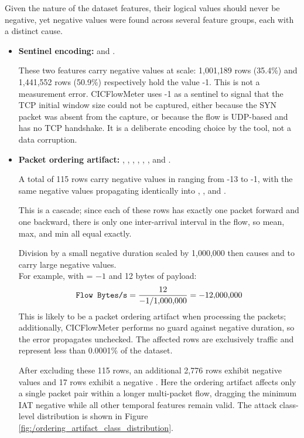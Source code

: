 Given the nature of the dataset features, their logical values should never be negative, yet negative values were found across several feature groups, each with a distinct cause.
\begin{itemize}
    \item \textbf{Sentinel encoding:}  and .

          These two features carry negative values at scale: 1,001,189 rows (35.4\%) and 1,441,552 rows (50.9\%) respectively hold the value -1. This is not a measurement error. CICFlowMeter uses -1 as a sentinel to signal that the TCP initial window size could not be captured, either because the SYN packet was absent from the capture, or because the flow is UDP-based and has no TCP handshake. It is a deliberate encoding choice by the tool, not a data corruption.

    \item \textbf{Packet ordering artifact:} , , , , , , and .


          A total of 115 rows carry negative values in  ranging from -13 to -1, with the same negative values propagating identically into , , and .

          This is a cascade; since each of these rows has exactly one packet forward and one backward, there is only one inter-arrival interval in the flow, so mean, max, and min all equal  exactly.

          Division by a small negative duration scaled by 1,000,000 then causes  and  to carry large negative values.\\
          For example, with  = $-1$ and 12 bytes of payload:
          \[
              \texttt{Flow Bytes/s} = \frac{12}{-1 / 1{,}000{,}000} = -12{,}000{,}000
          \]
          This is likely to be a packet ordering artifact when processing the packets; additionally, CICFlowMeter performs no guard against negative duration, so the error propagates unchecked. The affected rows are exclusively  traffic and represent less than 0.0001\% of the dataset.

          After excluding these 115 rows, an additional 2,776 rows exhibit negative  values and 17 rows exhibit a negative .
          Here the ordering artifact affects only a single packet pair within a longer multi-packet flow, dragging the minimum IAT negative while all other temporal features remain valid.
          The attack class-level distribution is shown in Figure \ref{fig:/ordering_artifact_class_distribution}.
\end{itemize}

